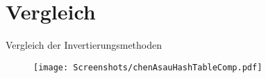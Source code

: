 \section{Vergleich}

\begin{frame}{Vergleich der Invertierungsmethoden}
    \begin{figure}
        \centering
        \texttt{[image: Screenshots/chenAsauHashTableComp.pdf]}
        \caption{\cite{chen_asau-generating_random_variates-1974}}
    \end{figure}
\end{frame}

